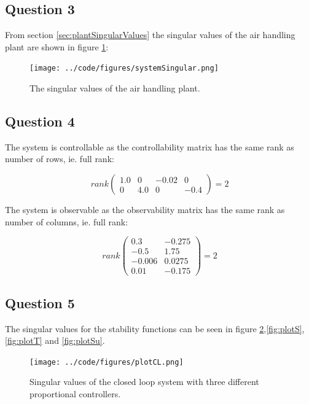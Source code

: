 \documentclass[a4paper, titlepage]{article}
\begin{document}
\subsection{Question 3}
From section \ref{sec:plantSingularValues} the singular values of the air handling plant are shown in figure \ref{fig:systemsingular}:


\begin{figure}[h!]
\center
\texttt{[image: ../code/figures/systemSingular.png]}
\caption{The singular values of the air handling plant.}
\label{fig:systemsingular}
\end{figure}


\subsection{Question 4}

The system is controllable as the controllability matrix has the same rank as number of rows, ie. full rank:

\begin{equation}
rank
\begin{pmatrix}
1.0 & 0 & -0.02 & 0 \\ 0 & 4.0 & 0 & -0.4
\end{pmatrix}
= 2
\end{equation}


The system is observable as the observability matrix has the same rank as number of columns, ie. full rank:

\begin{equation}
rank
\begin{pmatrix}
0.3 & -0.275 \\ -0.5 & 1.75 \\ -0.006 & 0.0275 \\ 0.01 & -0.175
\end{pmatrix}
= 2
\end{equation}


\subsection{Question 5}
The singular values for the stability functions can be seen in figure \ref{fig:plotCL},\ref{fig:plotS},\ref{fig:plotT} and \ref{fig:plotSu}.


\begin{figure}[H]
\center
\texttt{[image: ../code/figures/plotCL.png]}
\caption{Singular values of the closed loop system with three different proportional controllers.}
\label{fig:plotCL}
\end{figure}
\end{document}

